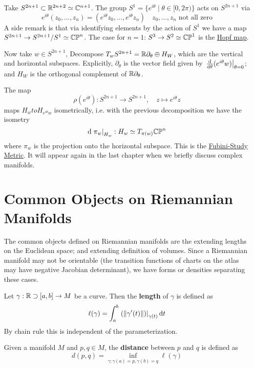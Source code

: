 \documentclass{article}
\begin{document}
\begin{example}
    Take $S^{2n+1} \subset \mathbb{R}^{2n+2} \simeq \mathbb{C}^{n+1}$. The group $S^1 = \{ e^{i \theta} \mid \theta \in [0, 2 \pi) \}$ acts on $S^{2n+1}$ via
    \[
        e^{i \theta} (z_0, \dots, z_n) = (e^{i \theta} z_0, \dots, e^{i \theta} z_n) \quad \text{$z_0, \dots, z_n$ not all zero}
    \]
    A side remark is that via identifying elements by the action of $S^1$ we have a map $S^{2n+1} \to S^{2n+1}/S^1 \simeq \mathbb{CP}^n$. The case for $n = 1$: $S^3 \to S^2 \simeq \mathbb{CP}^1$ is the \underline{Hopf map}. 

    Now take $w \in S^{2n+1}$, Decompose $T_w S^{2n+1} = \mathbb{R} \partial_{\theta} \oplus H_W$, which are the vertical and horizontal subspaces. Explicitly, $\partial_{\theta}$ is the vector field given by $\left.\frac{\mathrm{d}}{\mathrm{d} \theta} (e^{i \theta} w)\right|_{\theta = 0}$; and $H_W$ is the orthogonal complement of $\mathbb{R} \partial_{\theta}$. 

    The map 
    \[
        \rho(e^{i \theta}): S^{2n+1} \to S^{2n+1}, \quad z \mapsto e^{i \theta}z
    \]
    maps $H_w to H_{e^{i \theta}w}$ isometrically, i.e. with the previous decomposition we have the isometry
    \[
        \mathrm{d} \left.\pi_w\right|_{H_w} : H_w \simeq T_{\pi(w)} \mathbb{CP}^n
    \]
    where $\pi_w$ is the projection onto the horizontal subspace. This is the \underline{Fubini-Study Metric}. It will appear again in the last chapter when we briefly discuss complex manifolds.
\end{example}

\section{Common Objects on Riemannian Manifolds}

\textstart
The common objects defined on Riemannian manifolds are the  extending lengths on the Euclidean space; and  extending definition of volumes. Since a Riemannian manifold may not be orientable (the transition functions of charts on the atlas may have negative Jacobian determinant), we have forms or densities separating these cases.

\begin{definition}
    Let $\gamma: \mathbb{R} \supset [a, b] \to M$ be a curve. Then the \textbf{length} of $\gamma$ is defined as
    \[
        \ell(\gamma) = \int_a^b \left.\left(\left\|\gamma'(t)\right\|\right)\right|_{\gamma(t)} \mathrm{d} t
    \] 
    By chain rule this is independent of the parameterization.
\end{definition}
\nogap
\begin{definition}[Distance]
    Given a manifold $M$ and $p, q \in M$, the \textbf{distance} between $p$ and $q$ is defined as
    \[
        d(p, q) = \inf_{\gamma : \gamma(a) = p, \gamma(b) = q} \ell(\gamma)
    \]
\end{definition}
\end{document}
